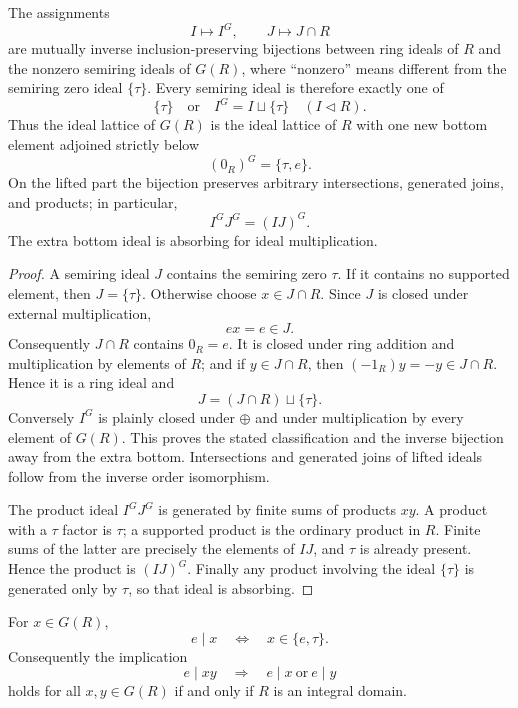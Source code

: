 \begin{theorem}
\label{thm:gcue-ideal-lattice}
The assignments
\[
 I\longmapsto I^G,
 \qquad
 J\longmapsto J\cap R
\]
are mutually inverse inclusion-preserving bijections between ring ideals of $R$ and the
nonzero semiring ideals of $G(R)$, where ``nonzero'' means different from the semiring zero
ideal $\{\tau\}$.  Every semiring ideal is therefore exactly one of
\[
 \{\tau\}
 \quad\text{or}\quad
 I^G=I\sqcup\{\tau\}\quad(I\lhd R).
\]
Thus the ideal lattice of $G(R)$ is the ideal lattice of $R$ with one new bottom element
adjoined strictly below
\[
 (0_R)^G=\{\tau,e\}.
\]
On the lifted part the bijection preserves arbitrary intersections, generated joins, and
products; in particular,
\[
 I^GJ^G=(IJ)^G.
\]
The extra bottom ideal is absorbing for ideal multiplication.
\end{theorem}

\begin{proof}
A semiring ideal $J$ contains the semiring zero $\tau$.  If it contains no supported
element, then $J=\{\tau\}$.  Otherwise choose $x\in J\cap R$.  Since $J$ is closed under
external multiplication,
\[
 ex=e\in J.
\]
Consequently $J\cap R$ contains $0_R=e$.  It is closed under ring addition and
multiplication by elements of $R$; and if $y\in J\cap R$, then
$(-1_R)y=-y\in J\cap R$.  Hence it is a ring ideal and
\[
 J=(J\cap R)\sqcup\{\tau\}.
\]
Conversely $I^G$ is plainly closed under $\oplus$ and under multiplication by every element
of $G(R)$.  This proves the stated classification and the inverse bijection away from the
extra bottom.  Intersections and generated joins of lifted ideals follow from the inverse
order isomorphism.

The product ideal $I^GJ^G$ is generated by finite sums of products $xy$.  A product with a
$\tau$ factor is $\tau$; a supported product is the ordinary product in $R$.  Finite sums of
the latter are precisely the elements of $IJ$, and $\tau$ is already present.  Hence the
product is $(IJ)^G$.
Finally any product involving the ideal $\{\tau\}$ is generated only by $\tau$, so that
ideal is absorbing.
\end{proof}

\begin{proposition}
\label{prop:gcue-zero-divisibility}
For $x\in G(R)$,
\[
 e\mid x\quad\Longleftrightarrow\quad x\in\{e,\tau\}.
\]
Consequently the implication
\[
 e\mid xy\quad\Longrightarrow\quad e\mid x\ \text{or}\ e\mid y
\]
holds for all $x,y\in G(R)$ if and only if $R$ is an integral domain.
\end{proposition}

